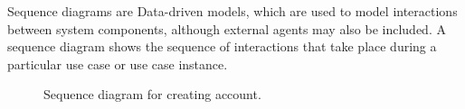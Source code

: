 
Sequence diagrams are Data-driven models, which are used to model interactions between system components, although external agents may also be included. A sequence diagram shows the sequence of interactions that take place during a particular use case or use case instance.

\begin{figure}[H]
\begin{center}	

	\caption{Sequence diagram for creating account.}
	\label{dia_sqns_crtaccnt}

\end{center}
\end{figure}

